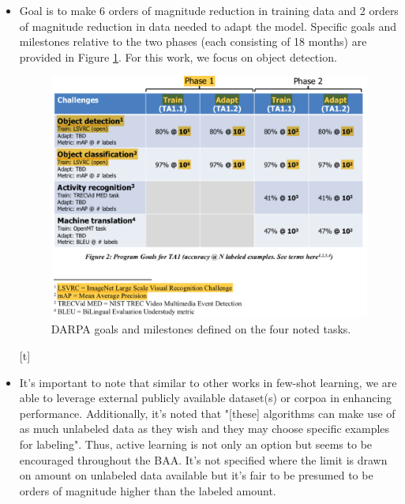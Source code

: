 \documentclass{article}
\begin{document}
\begin{itemize}
    \item Goal is to make 6 orders of magnitude reduction in training data and 2 orders of magnitude reduction in data needed to adapt the model. Specific goals and milestones relative to the two phases (each consisting of 18 months) are provided in Figure \ref{goals}. For this work, we focus on object detection.
    \begin{figure}[t]
        \centering
        \includegraphics[width=6in]{Goals.png}
        \caption{DARPA goals and milestones defined on the four noted tasks.}
        \label{goals}
    \end{figure}[t]
    \item It's important to note that similar to other works in few-shot learning, we are able to leverage external publicly available dataset(s) or corpoa in enhancing performance. Additionally, it's noted that "[these] algorithms can make use of as much unlabeled data as they wish and they may choose specific examples for labeling". Thus, active learning is not only an option but seems to be encouraged throughout the BAA. It's not specified where the limit is drawn on amount on unlabeled data available but it's fair to be presumed to be orders of magnitude higher than the labeled amount.
\end{itemize}
\end{document}
